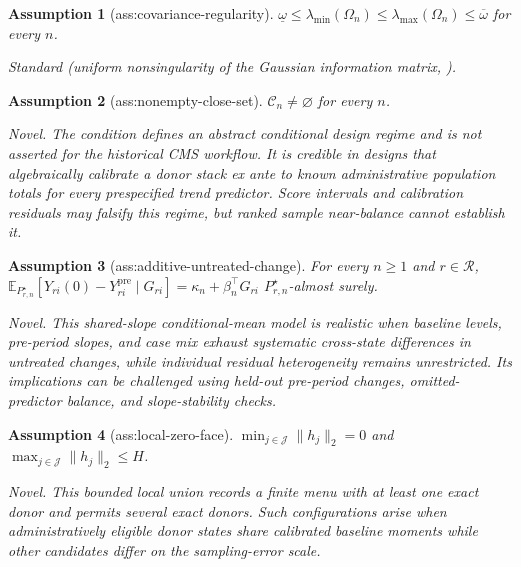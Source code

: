 \documentclass{article}
\newtheorem{assumption}{Assumption}
\begin{document}
\begin{assumption}[ass:covariance-regularity]\label{ass:covariance-regularity}
\(\underline\omega\le\lambda_{\min}(\Omega_n)\le\lambda_{\max}(\Omega_n)\le\overline\omega\) for every \(n\).
\par\smallskip\noindent\emph{Standard} (uniform nonsingularity of the Gaussian information matrix, \cite{AndrewsMikusheva2016}).
\end{assumption}

\begin{assumption}[ass:nonempty-close-set]\label{ass:nonempty-close-set}
\(\mathcal C_n\ne\varnothing\) for every \(n\).
\par\smallskip\noindent\emph{Novel.} The condition defines an abstract conditional design regime and is not asserted for the historical CMS workflow. It is credible in designs that algebraically calibrate a donor stack ex ante to known administrative population totals for every prespecified trend predictor. Score intervals and calibration residuals may falsify this regime, but ranked sample near-balance cannot establish it.
\end{assumption}

\begin{assumption}[ass:additive-untreated-change]\label{ass:additive-untreated-change}
For every \(n\ge1\) and \(r\in\mathcal R\), \(\mathbb E_{P_{r,n}^{\star}}[Y_{ri}(0)-Y_{ri}^{\mathrm{pre}}\mid G_{ri}]=\kappa_n+\beta_n^{\top}G_{ri}\) \(P_{r,n}^{\star}\)-almost surely.
\par\smallskip\noindent\emph{Novel.} This shared-slope conditional-mean model is realistic when baseline levels, pre-period slopes, and case mix exhaust systematic cross-state differences in untreated changes, while individual residual heterogeneity remains unrestricted. Its implications can be challenged using held-out pre-period changes, omitted-predictor balance, and slope-stability checks.
\end{assumption}

\begin{assumption}[ass:local-zero-face]\label{ass:local-zero-face}
\(\min_{j\in\mathcal J}\|h_j\|_2=0\) and \(\max_{j\in\mathcal J}\|h_j\|_2\le H\).
\par\smallskip\noindent\emph{Novel.} This bounded local union records a finite menu with at least one exact donor and permits several exact donors. Such configurations arise when administratively eligible donor states share calibrated baseline moments while other candidates differ on the sampling-error scale.
\end{assumption}
\end{document}
